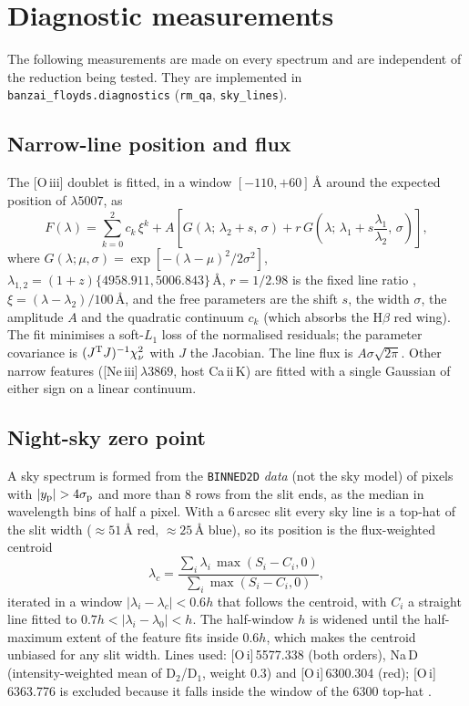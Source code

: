 \section{Diagnostic measurements}
\label{sec:diagnostics}

The following measurements are made on every spectrum and are independent of the reduction being tested. They are
implemented in \texttt{banzai\_floyds.diagnostics} (\texttt{rm\_qa}, \texttt{sky\_lines}).

\subsection{Narrow-line position and flux}
\label{sec:diag_narrow}
The [O\,{\sc iii}] doublet is fitted, in a window $[-110,+60]$\,\AA{} around the expected position of
$\lambda5007$, as
\begin{equation}
F(\lambda) = \sum_{k=0}^{2} c_k\,\xi^k + A\left[ G(\lambda;\,\lambda_{2}+s,\,\sigma)
 + r\,G\!\left(\lambda;\,\lambda_{1}+s\frac{\lambda_1}{\lambda_2},\,\sigma\right)\right],
\label{eq:o3}
\end{equation}
where $G(\lambda;\mu,\sigma)=\exp[-(\lambda-\mu)^2/2\sigma^2]$, $\lambda_{1,2}=(1+z)\{4958.911,5006.843\}$\,\AA,
$r=1/2.98$ is the fixed line ratio \citep{Storey2000}, $\xi=(\lambda-\lambda_2)/100$\,\AA, and the free parameters are
the shift $s$, the width $\sigma$, the amplitude $A$ and the quadratic continuum $c_k$ (which absorbs the
H$\beta$ red wing). The fit minimises a soft-$L_1$ loss of the normalised residuals; the parameter covariance is
$(J^{\rm T}J)^{-1}\chi^2_\nu$ with $J$ the Jacobian. The line flux is $A\sigma\sqrt{2\pi}$. Other narrow features
([Ne\,{\sc iii}]\,$\lambda3869$, host Ca\,{\sc ii}\,K) are fitted with a single Gaussian of either sign on a linear
continuum.

\subsection{Night-sky zero point}
\label{sec:diag_sky}
A sky spectrum is formed from the \texttt{BINNED2D} \emph{data} (not the sky model) of pixels with
$|y_{\rm p}|>4\sigma_{\rm p}$ and more than 8 rows from the slit ends, as the median in wavelength bins of half a
pixel. With a 6\,arcsec slit every sky line is a top-hat of the slit width ($\approx51$\,\AA{} red,
$\approx25$\,\AA{} blue), so its position is the flux-weighted centroid
\begin{equation}
\lambda_c = \frac{\sum_i \lambda_i\, \max(S_i - C_i, 0)}{\sum_i \max(S_i - C_i, 0)},
\label{eq:centroid}
\end{equation}
iterated in a window $|\lambda_i-\lambda_c|<0.6h$ that follows the centroid, with $C_i$ a straight line fitted to
$0.7h<|\lambda_i-\lambda_0|<h$. The half-window $h$ is widened until the half-maximum extent of the feature fits inside
$0.6h$, which makes the centroid unbiased for any slit width. Lines used: [O\,{\sc i}]\,5577.338 (both orders),
Na\,D (intensity-weighted mean of D$_2$/D$_1$, weight 0.3) and [O\,{\sc i}]\,6300.304 (red); [O\,{\sc i}]\,6363.776
is excluded because it falls inside the window of the 6300 top-hat \citep{Osterbrock1996}.

